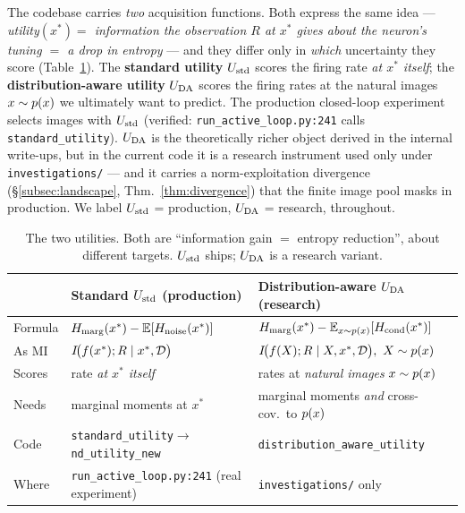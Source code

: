 \begin{remark}\label{rem:two-utilities}
The codebase carries \emph{two} acquisition functions. Both express the same idea
--- \emph{utility$(x^{*})=$ information the observation $R$ at $x^{*}$ gives about
the neuron's tuning $=$ a drop in entropy} --- and they differ only in
\emph{which} uncertainty they score (Table~\ref{tab:two-utilities}). The
\textbf{standard utility} $U_{\mathrm{std}}$ scores the firing rate \emph{at $x^{*}$ itself};
the \textbf{distribution-aware utility} $U_{\mathrm{DA}}$ scores the firing rates at the
natural images $x\sim p(x)$ we ultimately want to predict. The production
closed-loop experiment selects images with $U_{\mathrm{std}}$ (verified:
\texttt{run\_active\_loop.py:241} calls \texttt{standard\_utility}). $U_{\mathrm{DA}}$ is the
theoretically richer object derived in the internal write-ups, but in the current
code it is a research instrument used only under \texttt{investigations/} --- and
it carries a norm-exploitation divergence (\S\ref{subsec:landscape},
Thm.~\ref{thm:divergence}) that the finite image pool masks in production. We label
$U_{\mathrm{std}}$ = production, $U_{\mathrm{DA}}$ = research, throughout.
\end{remark}

\begin{table}[t]
  \centering
  \small
  \begin{tabular}{@{}lll@{}}
    \toprule
      & \textbf{Standard} $U_{\mathrm{std}}$ (production) & \textbf{Distribution-aware} $U_{\mathrm{DA}}$ (research)\\
    \midrule
    Formula      & $H_{\mathrm{marg}}(x^{*})-\mathbb{E}[H_{\mathrm{noise}}(x^{*})]$
                 & $H_{\mathrm{marg}}(x^{*})-\mathbb{E}_{x\sim p(x)}[H_{\mathrm{cond}}(x^{*})]$\\
    As MI        & $I\!\big(f(x^{*});R\mid x^{*},\mathcal D\big)$
                 & $I\!\big(\rate(X);R\mid X,x^{*},\mathcal D\big),\ X\sim\px$\\
    Scores       & rate \emph{at $x^{*}$ itself}
                 & rates at \emph{natural images} $x\sim p(x)$\\
    Needs        & marginal moments at $x^{*}$
                 & marginal moments \emph{and} cross-cov.\ to $p(x)$\\
    Code         & \texttt{standard\_utility}$\to$\texttt{nd\_utility\_new}
                 & \texttt{distribution\_aware\_utility}\\
    Where        & \texttt{run\_active\_loop.py:241} (real experiment)
                 & \texttt{investigations/} only\\
    \bottomrule
  \end{tabular}
  \caption{The two utilities. Both are ``information gain $=$ entropy reduction'',
  about different targets. $U_{\mathrm{std}}$ ships; $U_{\mathrm{DA}}$ is a research variant.}
  \label{tab:two-utilities}
\end{table}

